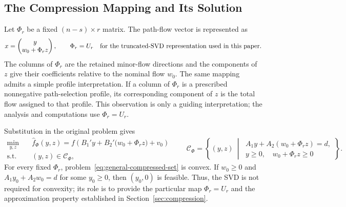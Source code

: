 \documentclass[11pt]{article}
\begin{document}
\subsection{The Compression Mapping and Its Solution}
\label{sec:compression-map}
{\color{red}
Let $\Phi_r$ be a fixed $(n-s)\times r$ matrix. The path-flow vector is represented as
\begin{equation}
\label{eq:general-map}
 x=\begin{pmatrix}y\\ w_0+\Phi_rz\end{pmatrix},
 \qquad
 \Phi_r=U_r\quad\hbox{for the truncated-SVD representation used in this paper}.
\end{equation}
The columns of $\Phi_r$ are the retained minor-flow directions and the components of $z$ give their coefficients relative to the nominal flow $w_0$. The same mapping admits a simple profile interpretation. If a column of $\Phi_r$ is a prescribed nonnegative path-selection profile, its corresponding component of $z$ is the total flow assigned to that profile. This observation is only a guiding interpretation; the analysis and computations use $\Phi_r=U_r$.

Substitution in the original problem gives
\begin{equation}
\label{eq:general-compressed-set}
\begin{aligned}
 \min_{y,z}\quad & \hat f_{\Phi}(y,z)
 =f\!\left(B_1'y+B_2'\bigl(w_0+\Phi_rz\bigr)+v_0\right)\\
 \text{s.t.}\quad & (y,z)\in\mathcal C_{\Phi},
\end{aligned}
\qquad
\mathcal C_{\Phi}=\left\{(y,z)\ \middle|\
\begin{array}{l}
 A_1y+A_2(w_0+\Phi_rz)=d,\\[-1mm]
 y\geq0,\quad w_0+\Phi_rz\geq0
\end{array}\right\}.
\end{equation}
For every fixed $\Phi_r$, problem~\eqref{eq:general-compressed-set} is convex. If $w_0\geq0$ and $A_1y_0+A_2w_0=d$ for some $y_0\geq0$, then $(y_0,0)$ is feasible. Thus, the SVD is not required for convexity; its role is to provide the particular map $\Phi_r=U_r$ and the approximation property established in Section~\ref{sec:compression}.

}
\end{document}
